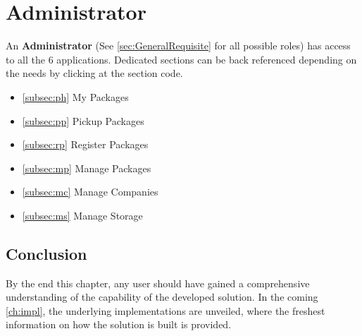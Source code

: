 \pagebreak
\section{Administrator}
\label{sec:UdocAdministrator}

An \textbf{Administrator} (See \autoref{sec:GeneralRequisite} for all possible roles) has access to all the 6 applications.
Dedicated sections can be back referenced depending on the needs by clicking at the section code.

\begin{itemize}
    \item \ref{subsec:ph} My Packages
    \item \ref{subsec:pp} Pickup Packages
    \item \ref{subsec:rp} Register Packages
    \item \ref{subsec:mp} Manage Packages
    \item \ref{subsec:mc} Manage Companies
    \item \ref{subsec:ms} Manage Storage
\end{itemize}

\subsection*{Conclusion}

By the end this chapter, any user should have gained a comprehensive understanding of the capability of the developed solution. In the coming \autoref{ch:impl}, the underlying implementations are unveiled, where the freshest information on how the solution is built is provided.